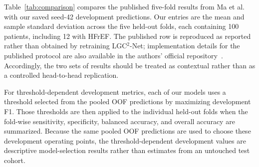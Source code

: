 \documentclass[11pt,a4paper]{article}
\begin{document}
Table~\ref{tab:comparison} compares the published five-fold results from
Ma et al.~\cite{ma2026hierarchical} with our saved seed-42 development
predictions. Our entries are the mean and sample standard deviation across the
five held-out folds, each containing 100 patients, including 12 with HFrEF.
The published row is reproduced as reported rather than obtained by retraining
LGC$^{2}$-Net; implementation details for the published protocol are also
available in the authors' official repository~\cite{lgc2implementation}.
Accordingly, the two sets of results should be treated as contextual rather
than as a controlled head-to-head replication.

For threshold-dependent development metrics, each of our models uses a
threshold selected from the pooled OOF predictions by maximizing development
F1. Those thresholds are then applied to the individual held-out folds when the
fold-wise sensitivity, specificity, balanced accuracy, and overall accuracy are
summarized. Because the same pooled OOF predictions are used to choose these
development operating points, the threshold-dependent development values are
descriptive model-selection results rather than estimates from an untouched
test cohort.


\begin{table}[htbp]
\centering
\caption{Published five-fold results and our development validation results.
Our entries are mean $\pm$ sample standard deviation across folds.
All metrics except AUROC are percentages. Protocols differ as described in the
text.}
\label{tab:comparison}
\begingroup
\setlength{\tabcolsep}{4pt}
\endgroup
\end{table}
\end{document}
